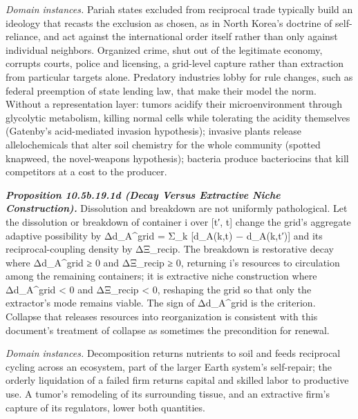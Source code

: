 \documentclass[
]{article}
\begin{document}
\emph{Domain instances.} Pariah states excluded from reciprocal trade
typically build an ideology that recasts the exclusion as chosen, as in
North Korea's doctrine of self-reliance, and act against the
international order itself rather than only against individual
neighbors. Organized crime, shut out of the legitimate economy, corrupts
courts, police and licensing, a grid-level capture rather than
extraction from particular targets alone. Predatory industries lobby for
rule changes, such as federal preemption of state lending law, that make
their model the norm. Without a representation layer: tumors acidify
their microenvironment through glycolytic metabolism, killing normal
cells while tolerating the acidity themselves (Gatenby's acid-mediated
invasion hypothesis); invasive plants release allelochemicals that alter
soil chemistry for the whole community (spotted knapweed, the
novel-weapons hypothesis); bacteria produce bacteriocins that kill
competitors at a cost to the producer.

\emph{\textbf{Proposition 10.5b.19.1d (Decay Versus Extractive Niche
Construction).}} Dissolution and breakdown are not uniformly
pathological. Let the dissolution or breakdown of container i over
{[}t′, t{]} change the grid's aggregate adaptive possibility by
Δd\_A\^{}grid = Σ\_k {[}d\_A(k,t) − d\_A(k,t′){]} and its
reciprocal-coupling density by ΔΞ\_recip. The breakdown is restorative
decay where Δd\_A\^{}grid ≥ 0 and ΔΞ\_recip ≥ 0, returning i's resources
to circulation among the remaining containers; it is extractive niche
construction where Δd\_A\^{}grid \textless{} 0 and ΔΞ\_recip \textless{}
0, reshaping the grid so that only the extractor's mode remains viable.
The sign of Δd\_A\^{}grid is the criterion. Collapse that releases
resources into reorganization is consistent with this document's
treatment of collapse as sometimes the precondition for renewal.

\emph{Domain instances.} Decomposition returns nutrients to soil and
feeds reciprocal cycling across an ecosystem, part of the larger Earth
system's self-repair; the orderly liquidation of a failed firm returns
capital and skilled labor to productive use. A tumor's remodeling of its
surrounding tissue, and an extractive firm's capture of its regulators,
lower both quantities.
\end{document}
